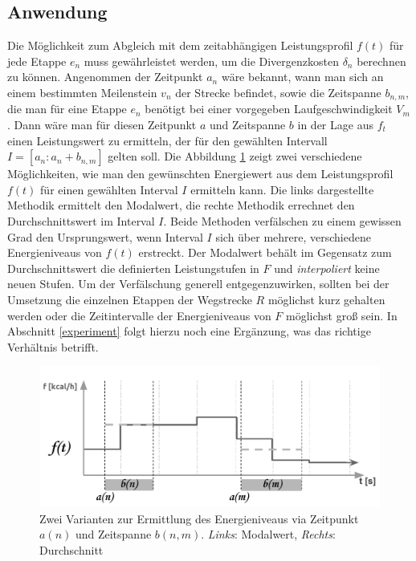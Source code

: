 \documentclass[12pt]{article}
\begin{document}
\subsection{Anwendung}\label{apply}
Die Möglichkeit zum Abgleich mit dem zeitabhängigen Leistungsprofil $f(t)$ für jede Etappe $e_{n}$ muss gewährleistet werden, um die Divergenzkosten $\delta_{n}$ berechnen zu können. Angenommen der Zeitpunkt $a_{n}$ wäre bekannt, wann man sich an einem bestimmten Meilenstein $v_{n}$ der Strecke befindet, sowie die Zeitspanne $b_{n,m}$, die man für eine Etappe $e_{n}$ benötigt bei einer vorgegeben Laufgeschwindigkeit $V_{m}$. Dann wäre man für diesen Zeitpunkt $a$ und Zeitspanne $b$ in der Lage aus $f_{t}$ einen Leistungswert zu ermitteln, der für den gewählten Intervall $ I = \left[ a_{n} : a_{n}+b_{n,m}\right]$ gelten soll. Die Abbildung \ref{pic:get_power} zeigt zwei verschiedene Möglichkeiten, wie man den gewünschten Energiewert aus dem Leistungsprofil $f(t)$ für einen gewählten Interval $I$ ermitteln kann. Die links dargestellte Methodik ermittelt den Modalwert, die rechte Methodik errechnet den Durchschnittswert im Interval $I$. Beide Methoden verfälschen zu einem gewissen Grad den Ursprungswert, wenn Interval $I$ sich über mehrere, verschiedene Energieniveaus von $f(t)$ erstreckt. Der Modalwert behält im Gegensatz zum Durchschnittswert die definierten Leistungstufen in $F$ und \textit{interpoliert} keine neuen Stufen. Um der Verfälschung generell entgegenzuwirken, sollten bei der Umsetzung die einzelnen Etappen der Wegstrecke $R$ möglichst kurz gehalten werden oder die Zeitintervalle der Energieniveaus von $F$ möglichst groß sein. In Abschnitt \ref{experiment} folgt hierzu noch eine Ergänzung, was das richtige Verhältnis betrifft.

\begin{figure}[ht]
	\begin{center}
	\includegraphics[width=360pt]{pics/pdf/007_get_proposed_Power.pdf}
	\caption{Zwei Varianten zur Ermittlung des Energieniveaus via Zeitpunkt $a(n)$ und Zeitspanne $b(n,m)$. \textit{Links}: Modalwert, \textit{Rechts}: Durchschnitt}
	\label{pic:get_power}
	\end{center}
\end{figure}
\end{document}
